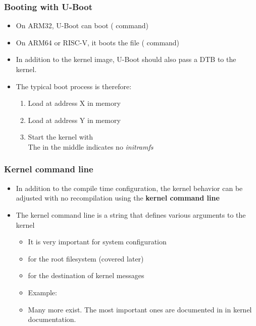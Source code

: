 \begin{frame}
  \frametitle{Booting with U-Boot}
  \begin{itemize}
  \item On ARM32, U-Boot can boot  ( command)
  \item On ARM64 or RISC-V, it boots the  file ( command)
  \item In addition to the kernel image, U-Boot should also pass a
        DTB to the kernel.
  \item The typical boot process is therefore:
    \begin{enumerate}
    \item Load  at address X in memory
    \item Load  at address Y in memory
    \item Start the kernel with  \\
      The \code{-} in the middle indicates no {\em initramfs}
    \end{enumerate}
  \end{itemize}
\end{frame}

\begin{frame}
  \frametitle{Kernel command line}
  \begin{itemize}
  \item In addition to the compile time configuration, the kernel
    behavior can be adjusted with no recompilation using the {\bf
      kernel command line}
  \item The kernel command line is a string that defines various
    arguments to the kernel
    \begin{itemize}
    \item It is very important for system configuration
    \item {} for the root filesystem (covered later)
    \item {} for the destination of kernel messages
    \item Example: 
    \item Many more exist. The most important ones are documented
          in  in kernel
          documentation.
    \end{itemize}
  \end{itemize}
\end{frame}

